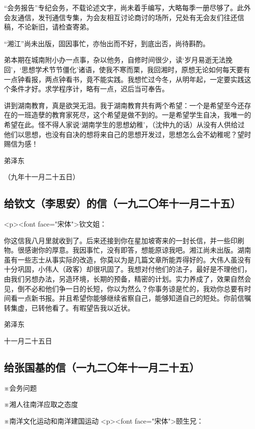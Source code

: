 “会务报告”专纪会务，不载论述文字，尚未着手编写，大略每季一册尽够了。此外会友通信，发刊通信专集，为会友相互讨论商讨的场所，兄处有无会友们往还信稿，不论新旧，请检查寄弟。

“湘江”尚未出版，固因事忙，亦怡出而不好，到底出否，尚待斟酌。

弟本期在城南附小办一点事，杂以他务，自修时间很少，读‘岁月易逝无法挽回’，‘思想学术节节僵化’诸语，使我不寒而栗，我回湘时，原想无论如何每天要有一点钟看报，两点钟看书，竟不能实践。我想忙过今冬，从明年起，一定要实践这个条件才好。求学程序计，略有一点，迟后当可奉告。

讲到湖南教育，真是欲哭无泪。我于湖南教育共有两个希望：一个是希望至今还存在的一班造孽的教育家死尽，这个希望是做不到的。一是希望学生自决，我唯一的希望在此。怪不得人家说‘湖南学生的思想幼稚’，（沈仲九的话）从没有人供给过他们以思想，也没有自决的想将来自己的思想开发过，思想怎么会不幼稚呢？望时赐信为感！

 弟泽东

 （九年十一月二十五日）
\subsection{给钦文（李思安）的信（一九二〇年十一月二十五）}
<p><font face="宋体">钦文姐：

你这信我八月里就收到了。后来还接到你在星加坡寄来的一封长信，并一些印刷物。很感谢你的厚意。我因事忙，没有即答，想能原谅我吧。湘江尚未出版。湖南虽有一些志士从事实际的改造，你莫以为是几篇文章所能弄得好的。大伟人虽没有十分巩固，小伟人（政客）却很巩固了。我想对付他们的法子，最好是不理他们，由我们另想办法，另造环境，长期的预备，精密的计划。实力养成了，效果自然会见，倒不必和他们争一日的长短，你以为然么？你事务谅是忙的，我劝你总要有时间看一点新书报。并且希望你能够继续省察自己，能够知道自己的短处。你前信嘱转集虚，已转他看了。有暇望告我以近状。

 弟泽东

 十一月二十五日
\subsection{给张国基的信（一九二〇年十一月二十五）}

※会务问题

※湘人往南洋应取之态度

※南洋文化运动和南洋建国运动
<p><font face="宋体">颐生兄：

